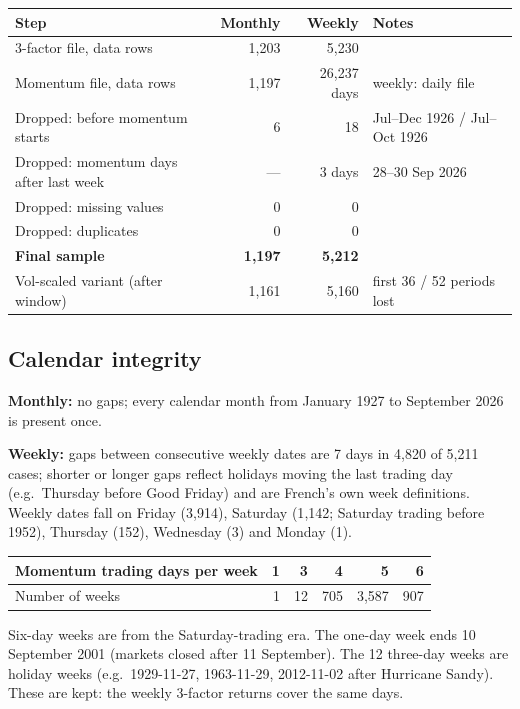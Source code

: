\documentclass[11pt]{article}
\begin{document}
\begin{center}
\small
\begin{tabularx}{\textwidth}{@{}Xrrl@{}}
\toprule
Step & Monthly & Weekly & Notes \\
\midrule
3-factor file, data rows & 1{,}203 & 5{,}230 & \\
Momentum file, data rows & 1{,}197 & 26{,}237 days & weekly: daily file \\
Dropped: before momentum starts & 6 & 18 & Jul--Dec 1926 / Jul--Oct 1926 \\
Dropped: momentum days after last week & --- & 3 days & 28--30 Sep 2026 \\
Dropped: missing values & 0 & 0 & \\
Dropped: duplicates & 0 & 0 & \\
\midrule
\textbf{Final sample} & \textbf{1{,}197} & \textbf{5{,}212} & \\
Vol-scaled variant (after window) & 1{,}161 & 5{,}160 & first 36 / 52 periods lost \\
\bottomrule
\end{tabularx}
\end{center}

\subsection{Calendar integrity}
\textbf{Monthly:} no gaps; every calendar month from January 1927 to September 2026 is present once.

\textbf{Weekly:} gaps between consecutive weekly dates are 7 days in 4{,}820 of 5{,}211 cases; shorter or longer gaps reflect holidays moving the last trading day (e.g.\ Thursday before Good Friday) and are French's own week definitions. Weekly dates fall on Friday (3{,}914), Saturday (1{,}142; Saturday trading before 1952), Thursday (152), Wednesday (3) and Monday (1).

\begin{center}
\begin{tabular}{lrrrrr}
\toprule
Momentum trading days per week & 1 & 3 & 4 & 5 & 6 \\
\midrule
Number of weeks & 1 & 12 & 705 & 3{,}587 & 907 \\
\bottomrule
\end{tabular}
\end{center}
Six-day weeks are from the Saturday-trading era. The one-day week ends 10 September 2001 (markets closed after 11 September). The 12 three-day weeks are holiday weeks (e.g.\ 1929-11-27, 1963-11-29, 2012-11-02 after Hurricane Sandy). These are kept: the weekly 3-factor returns cover the same days.
\end{document}
